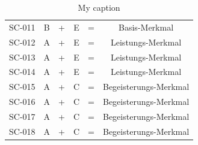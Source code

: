 \begin{table}[h!]
\begin{tabular}{cccccc}
SC-011        & B                                                             & + & E                                                                & = & Basis-Merkmal         \\
SC-012        & A                                                             & + & E                                                                & = & Leistungs-Merkmal     \\
SC-013        & A                                                             & + & E                                                                & = & Leistungs-Merkmal     \\
SC-014        & A                                                             & + & E                                                                & = & Leistungs-Merkmal     \\
SC-015        & A                                                             & + & C                                                                & = & Begeisterungs-Merkmal \\
SC-016        & A                                                             & + & C                                                                & = & Begeisterungs-Merkmal \\
SC-017        & A                                                             & + & C                                                                & = & Begeisterungs-Merkmal \\
SC-018        & A                                                             & + & C                                                                & = & Begeisterungs-Merkmal
\end{tabular}
\caption{My caption}
\end{table}









